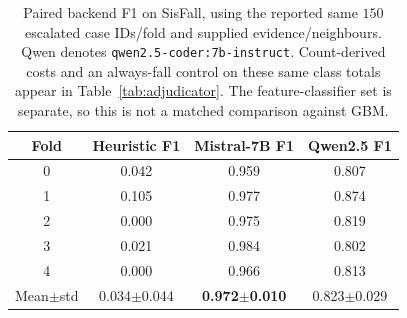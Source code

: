 \begin{table}[!t]
\centering
\caption{Paired backend F1 on SisFall, using the reported same $150$ escalated case IDs/fold and supplied evidence/neighbours. Qwen denotes \texttt{qwen2.5-coder:7b-instruct}. Count-derived costs and an always-fall control on these same class totals appear in Table~\ref{tab:adjudicator}. The feature-classifier set is separate, so this is not a matched comparison against GBM.}
\label{tab:llm}
\begin{tabular}{cccc}
\toprule
Fold & Heuristic F1 & Mistral-7B F1 & Qwen2.5 F1 \\
\midrule
0 & 0.042 & 0.959 & 0.807 \\
1 & 0.105 & 0.977 & 0.874 \\
2 & 0.000 & 0.975 & 0.819 \\
3 & 0.021 & 0.984 & 0.802 \\
4 & 0.000 & 0.966 & 0.813 \\
\midrule
Mean$\pm$std & 0.034$\pm$0.044 & \textbf{0.972$\pm$0.010} & 0.823$\pm$0.029 \\
\bottomrule
\end{tabular}
\end{table}
